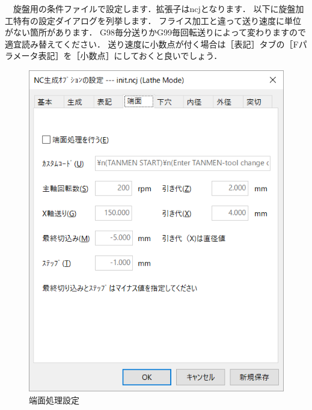 

\vspace*{1zh}
　旋盤用の条件ファイルで設定します．拡張子はncjとなります．
以下に旋盤加工特有の設定ダイアログを列挙します．
フライス加工と違って送り速度に単位がない箇所があります．
G98毎分送りかG99毎回転送りによって変わりますので適宜読み替えてください．
送り速度に小数点が付く場合は［表記］タブの［Fパラメータ表記］を［小数点］にしておくと良いでしょう．

\begin{minipage}{0.5\textwidth}
\begin{figure}[H]
\centering
\includegraphics[scale=0.7]{No2/fig/ncj1.png}
\caption{端面処理設定}
\label{fig:ncj1.png}
\end{figure}
\end{minipage}
